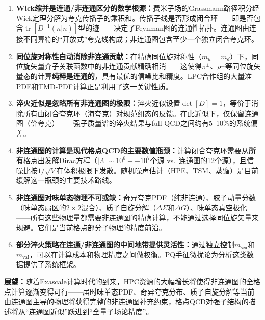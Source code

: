 \documentclass[12pt,a4paper]{ctexart}
\theoremstyle{definition}
\begin{document}
\begin{enumerate}[leftmargin=*]
    \item \textbf{Wick缩并是连通/非连通区分的数学根源：}费米子场的Grassmann路径积分经Wick定理分解为夸克传播子的乘积和。传播子线是否形成闭合环——即是否包含$\operatorname{tr}[D^{-1}(n|n)]$型的迹——决定了Feynman图的连通性拓扑。连通图由连接不同算符的``开放式''夸克线构成；非连通图包含至少一个独立闭合夸克环。

    \item \textbf{同位旋对称性自动消除非连通贡献：}在精确同位旋对称性（$m_u=m_d$）下，同位旋矢量介子关联函数中的非连通贡献精确相消——这使得$\pi^\pm$、$\rho^\pm$等同位旋矢量态的计算\textbf{纯粹是连通的}，具有最优的信噪比和精度。LPC合作组的大量准PDF和TMD-PDF计算正是利用了这一关键性质。

    \item \textbf{淬火近似是忽略所有非连通图的极限：}淬火近似设置$\det[D] = 1$，等价于消除所有由闭合夸克环（海夸克）对规范组态的反馈。在此近似下，仅保留连通图（价夸克）——强子质量谱的淬火结果与full QCD之间约有5--10\%的系统偏差。

    \item \textbf{非连通图的计算是现代格点QCD的主要数值瓶颈：}计算闭合夸克环需要从\textbf{所有}格点出发解Dirac方程（$|\Lambda| \sim 10^6--10^7$个源 vs.\ 连通图的12个源），且信噪比按$1/\sqrt{V}$在体积极限下发散。随机噪声估计（HPE、TSM、蒸馏）是目前缓解这一瓶颈的主要技术路线。

    \item \textbf{非连通图对味单态物理不可或缺：}奇异夸克PDF（纯非连通）、胶子动量分数（味单态扇区的$2\times2$混合）、质子自旋分解（$\Delta\Sigma$和$\Delta G$）、味单态真空极化——所有这些物理量都需要非连通图的精确计算，不能通过选择同位旋矢量来规避。它们是当前格点部分子物理的精度前沿。

    \item \textbf{部分淬火策略在连通/非连通图的中间地带提供灵活性：}通过独立控制$m_{\text{sea}}$和$m_{\text{val}}$，可以在计算成本和物理精度之间做权衡。PQ手征微扰论为分析这类数据提供了系统框架。

\end{enumerate}

\textbf{展望：}随着Exascale计算时代的到来，HPC资源的大幅增长将使得非连通图的全格点计算逐渐变得可行——届时味单态PDF、奇异夸克分布、质子自旋分解等当前由连通图主导的物理将获得完整的非连通图补充约束，格点QCD对强子结构的描述将从``连通图近似''跃进到``全量子场论精度''。
\end{document}

